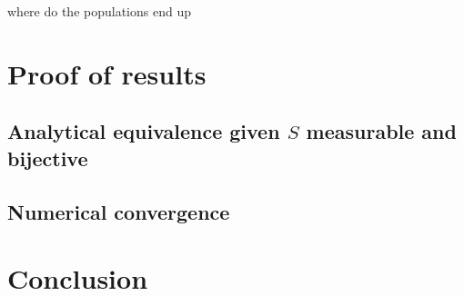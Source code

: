 \documentclass[10pt,letterpaper]{article}
\begin{document}
where do the populations end up 

\section{Proof of results}

\subsection{Analytical equivalence given $S$ measurable and bijective}
\label{sec:proof-equivalence}

\subsection{Numerical convergence}

\section{Conclusion}






\end{document}
